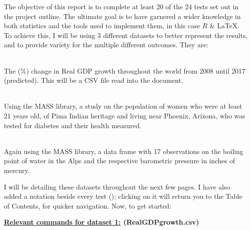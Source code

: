 \documentclass[12pt,a4paper]{article}
\begin{document}
\begin{titlepage}
The objective of this report is to complete at least 20 of the 24 tests set out in the project outline. The ultimate goal is to have garnered a wider knowledge in both statistics and the tools used to implement them, in this case $R$ \& {\LaTeX}. To achieve this, I will be using 3 different datasets to better represent the results, and to provide variety for the multiple different outcomes. They are:
\begin{description}
\small
\item[1.] \hfill \\ The (\%) change in Real GDP growth throughout the world from 2008 until 2017 (predicted). This will be a CSV file read into the document.
\item[2.] \hfill \\ Using the MASS library, a study on the population of women who were at least 21 years old, of Pima Indian heritage and living near Phoenix, Arizona, who was tested for diabetes and their health measured.
\item[3.] \hfill \\ Again using the MASS library, a data frame with 17 observations on the boiling point of water in the Alps and the respective barometric pressure in inches of mercury.
\end{description}
I will be detailing these datasets throughout the next few pages. I have also added a notation beside every test (\pageref{label:BTP}); clicking on it will return you to the Table of Contents, for quicker navigation. Now, to get started:
\end{titlepage}

\begin{center}{\textbf{\underline{Relevant commands for dataset 1:} (RealGDPgrowth.csv)}}\end{center}
\end{document}
